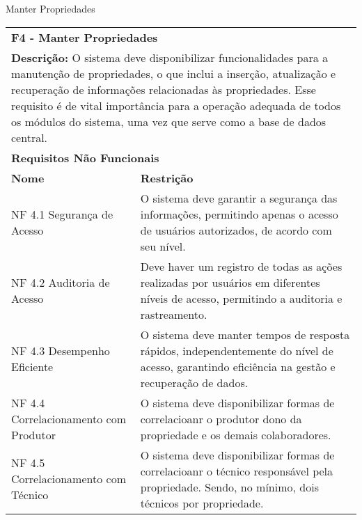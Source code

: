 \begin{tabframed}[htb]
  \caption{Manter Propriedades}
  \label{quad:requisitoManterPropriedades}
  \renewcommand{\arraystretch}{1.5}
  \begin{tabular}{|l|l|}
    \cline{1-2}
    \multicolumn{2}{|l|}{\textbf{F4 - Manter Propriedades}}
    \\ \cline{1-2}

    \multicolumn{2}{|p{15cm}|}{
    \raggedright \textbf{Descrição:} O sistema deve disponibilizar funcionalidades para a manutenção de propriedades, o que inclui a inserção, atualização e recuperação de informações relacionadas às propriedades. Esse requisito é de vital importância para a operação adequada de todos os módulos do sistema, uma vez que serve como a base de dados central.
    }
    \\ \cline{1-2}

    \multicolumn{2}{|l|}{\textbf{Requisitos Não Funcionais}}
    \\ \cline{1-2}

    \textbf{Nome}                         &
    \textbf{Restrição}
    \\ \cline{1-2}

    NF 4.1 Segurança de Acesso            &
    \multicolumn{1}{|p{9cm}|}{\raggedright O sistema deve garantir a segurança das informações, permitindo apenas o acesso de usuários autorizados, de acordo com seu nível.}
    \\ \cline{1-2}

    NF 4.2 Auditoria de Acesso            &
    \multicolumn{1}{|p{9cm}|}{\raggedright Deve haver um registro de todas as ações realizadas por usuários em diferentes níveis de acesso, permitindo a auditoria e rastreamento.}
    \\ \cline{1-2}

    NF 4.3 Desempenho Eficiente           &
    \multicolumn{1}{|p{9cm}|}{\raggedright O sistema deve manter tempos de resposta rápidos, independentemente do nível de acesso, garantindo eficiência na gestão e recuperação de dados.}
    \\ \cline{1-2}

    NF 4.4 Correlacionamento com Produtor &
    \multicolumn{1}{|p{9cm}|}{\raggedright O sistema deve disponibilizar formas de correlacioanr o produtor dono da propriedade e os demais colaboradores.}
    \\ \cline{1-2}

    NF 4.5 Correlacionamento com Técnico  &
    \multicolumn{1}{|p{9cm}|}{\raggedright O sistema deve disponibilizar formas de correlacioanr o técnico responsável pela propriedade. Sendo, no mínimo, dois técnicos por propriedade.}
    \\ \cline{1-2}


\end{tabular}
\end{tabframed}
